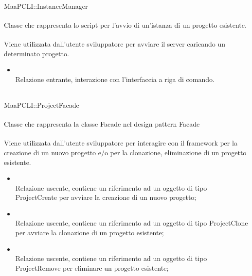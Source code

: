	\\
	MaaPCLI::InstanceManager\\
	\\
	Classe che rappresenta lo script per l'avvio di un'istanza di un progetto esistente.\\
	\\
	Viene utilizzata dall'utente sviluppatore per avviare il server caricando un determinato progetto.\\
	\begin{itemize}
	\item{}\\
	Relazione entrante, interazione con l'interfaccia a riga di comando.
	\end{itemize}
	
	\\
	MaaPCLI::ProjectFacade\\
	\\
	Classe che rappresenta la classe Facade nel design pattern Facade\\
	\\
	Viene utilizzata dall'utente sviluppatore per interagire con il framework per la creazione di un nuovo progetto e/o per la clonazione, eliminazione di un progetto esistente.\\
	\begin{itemize}
	\item{}\\
	Relazione uscente, contiene un riferimento ad un oggetto di tipo ProjectCreate per avviare la creazione di un nuovo progetto;
	\item{}\\
	Relazione uscente, contiene un riferimento ad un oggetto di tipo ProjectClone per avviare la clonazione di un progetto esistente;
	\item{}\\
	Relazione uscente, contiene un riferimento ad un oggetto di tipo ProjectRemove per eliminare un progetto esistente;
	\end{itemize}
	

